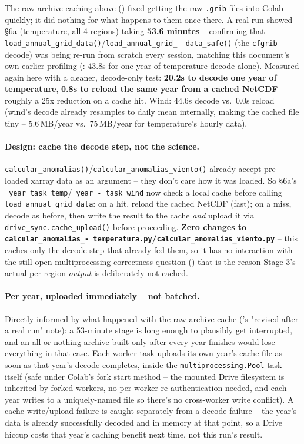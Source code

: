 \documentclass[11pt]{article}
\begin{document}
The raw-archive caching above () fixed
getting the raw \texttt{.grib} files into Colab quickly; it did nothing
for what happens to them once there. A real run showed \S6a
(temperature, all 4 regions) taking \textbf{53.6 minutes} -- confirming
that \texttt{load\_annual\_grid\_data()}/\texttt{load\_annual\_grid\_-
data\_safe()} (the \texttt{cfgrib} decode) was being re-run from scratch
every session, matching this document's own earlier profiling
(: 43.8s for one year of temperature decode alone).
Measured again here with a cleaner, decode-only test: \textbf{20.2s to
decode one year of temperature}, \textbf{0.8s to reload the same year
from a cached NetCDF} -- roughly a 25x reduction on a cache hit. Wind:
44.6s decode vs.\ 0.0s reload (wind's decode already resamples to daily
mean internally, making the cached file tiny -- 5.6\,MB/year vs.\
75\,MB/year for temperature's hourly data).

\paragraph{Design: cache the decode step, not the science.}
\texttt{calcular\_anomalias()}/\texttt{calcular\_anomalias\_viento()}
already accept pre-loaded xarray data as an argument -- they don't care
how it was loaded. So \S6a's \texttt{\_year\_task\_temp}/\texttt{\_year\_-
task\_wind} now check a local cache before calling
\texttt{load\_annual\_grid\_data}: on a hit, reload the cached NetCDF
(fast); on a miss, decode as before, then write the result to the cache
\emph{and} upload it via \texttt{drive\_sync.cache\_upload()} before
proceeding. \textbf{Zero changes to \texttt{calcular\_anomalias\_-
temperatura.py}/\texttt{calcular\_anomalias\_viento.py}} -- this caches
only the decode step that already fed them, so it has no interaction
with the still-open multiprocessing-correctness question
() that is the reason Stage 3's actual
per-region \emph{output} is deliberately not cached.

\paragraph{Per year, uploaded immediately -- not batched.} Directly
informed by what happened with the raw-archive cache
('s "revised after a real run" note): a
53-minute stage is long enough to plausibly get interrupted, and an
all-or-nothing archive built only after every year finishes would lose
everything in that case. Each worker task uploads its own year's cache
file as soon as that year's decode completes, inside the
\texttt{multiprocessing.Pool} task itself (safe under Colab's fork start
method -- the mounted Drive filesystem is inherited by forked workers,
no per-worker re-authentication needed, and each year writes to a
uniquely-named file so there's no cross-worker write conflict). A
cache-write/upload failure is caught separately from a decode failure --
the year's data is already successfully decoded and in memory at that
point, so a Drive hiccup costs that year's caching benefit next time,
not this run's result.
\end{document}
